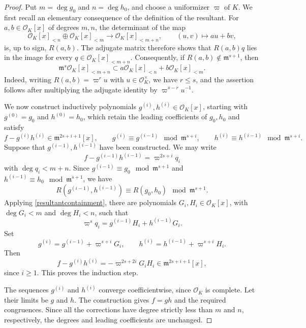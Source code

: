 \documentclass[11pt,a4paper]{article}
\theoremstyle{definition}
\theoremstyle{plain}
\theoremstyle{remark}
\theoremstyle{plain}
\begin{document}
\begin{proof}
    Put $m=\deg g_0$ and $n=\deg h_0$, and choose a uniformizer $\varpi$ of $K$. We first recall an elementary consequence of the definition of the resultant. For $a,b\in\mathcal{O}_K[x]$ of degrees $m,n$, the determinant of the map
    $$\mathcal{O}_K[x]_{<n}\oplus\mathcal{O}_K[x]_{<m}\longrightarrow\mathcal{O}_K[x]_{<m+n},\qquad (u,v)\longmapsto au+bv,$$
    is, up to sign, $R(a,b)$. The adjugate matrix therefore shows that $R(a,b)q$ lies in the image for every $q\in\mathcal{O}_K[x]_{<m+n}$. Consequently, if $R(a,b)\notin\mathfrak{m}^{s+1}$, then
    \begin{equation}\label{resultantcontainment}
        \mathfrak{m}^s\mathcal{O}_K[x]_{<m+n}\subset a\mathcal{O}_K[x]_{<n}+b\mathcal{O}_K[x]_{<m}.
    \end{equation}
    Indeed, writing $R(a,b)=\varpi^r u$ with $u\in\mathcal{O}_K^{\times}$, we have $r\leq s$, and the assertion follows after multiplying the adjugate identity by $\varpi^{s-r}u^{-1}$.

    We now construct inductively polynomials $g^{(i)},h^{(i)}\in\mathcal{O}_K[x]$, starting with $g^{(0)}=g_0$ and $h^{(0)}=h_0$, which retain the leading coefficients of $g_0,h_0$ and satisfy
    $$f-g^{(i)}h^{(i)}\in\mathfrak{m}^{2s+i+1}[x],\qquad g^{(i)}\equiv g^{(i-1)}\mod\mathfrak{m}^{s+i},\qquad h^{(i)}\equiv h^{(i-1)}\mod\mathfrak{m}^{s+i}.$$
    Suppose that $g^{(i-1)},h^{(i-1)}$ have been constructed. We may write
    $$f-g^{(i-1)}h^{(i-1)}=\varpi^{2s+i}q_i$$
    with $\deg q_i<m+n$. Since $g^{(i-1)}\equiv g_0\mod\mathfrak{m}^{s+1}$ and $h^{(i-1)}\equiv h_0\mod\mathfrak{m}^{s+1}$, we have
    $$R(g^{(i-1)},h^{(i-1)})\equiv R(g_0,h_0)\mod\mathfrak{m}^{s+1}.$$
    Applying \eqref{resultantcontainment}, there are polynomials $G_i,H_i\in\mathcal{O}_K[x]$, with $\deg G_i<m$ and $\deg H_i<n$, such that
    $$\varpi^s q_i=g^{(i-1)}H_i+h^{(i-1)}G_i.$$
    Set
    $$g^{(i)}=g^{(i-1)}+\varpi^{s+i}G_i,\qquad h^{(i)}=h^{(i-1)}+\varpi^{s+i}H_i.$$
    Then
    $$f-g^{(i)}h^{(i)}=-\varpi^{2s+2i}G_iH_i\in\mathfrak{m}^{2s+i+1}[x],$$
    since $i\geq1$. This proves the induction step.

    The sequences $g^{(i)}$ and $h^{(i)}$ converge coefficientwise, since $\mathcal{O}_K$ is complete. Let their limits be $g$ and $h$. The construction gives $f=gh$ and the required congruences. Since all the corrections have degree strictly less than $m$ and $n$, respectively, the degrees and leading coefficients are unchanged.
\end{proof}
\end{document}
